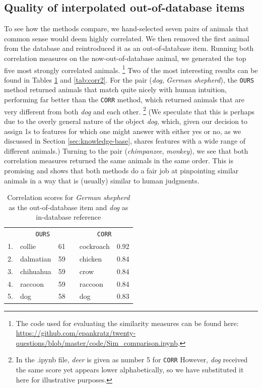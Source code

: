 \documentclass[11pt,a4paper]{article}
\begin{document}
{%
\subsection{Quality of interpolated out-of-database items}

To see how the methods compare, we hand-selected seven pairs of animals that common sense would deem highly correlated. We then removed the first animal from the database and reintroduced it as an out-of-database item. Running both correlation measures on the now-out-of-database animal, we generated the top five most strongly correlated animals.%
    \footnote{The code used for evaluating the similarity measures can be found here:  \url{https://github.com/epankratz/twenty-questions/blob/master/code/Sim_comparison.ipynb}.}
Two of the most interesting results can be found in Tables \ref{tab:corr1} and \ref{tab:corr2}.
For the pair (\textit{dog}, \textit{German shepherd}), the \texttt{OURS} method returned animals that match quite nicely with human intuition, performing far better than the \texttt{CORR} method, which returned animals that are very different from both \textit{dog} and each other.%
    \footnote{In the .ipynb file, \textit{deer} is given as number 5 for \texttt{CORR} However, \textit{dog} received the same score yet appears lower alphabetically, so we have substituted it here for illustrative purposes.}
(We speculate that this is perhaps due to the overly general nature of the object \textit{dog}, which, given our decision to assign 1s to features for which one might answer with either yes or no, as we discussed in Section \ref{sec:knowledge-base}, shares features with a wide range of different animals.) 
Turning to the pair (\textit{chimpanzee}, \textit{monkey}), we see that both correlation measures returned the same animals in the same order. 
This is promising and shows that both methods do a fair job at pinpointing similar animals in a way that is (usually) similar to human judgments.

\begin{table}[h]
    \centering
    \begin{tabular}{clcclc}
    \toprule
    & \multicolumn{2}{c}{\texttt{OURS}} && \multicolumn{2}{c}{\texttt{CORR}} \\
    \cmidrule{2-3} \cmidrule{5-6}
    1. & collie & 61 && cockroach & 0.92 \\
    2. & dalmatian & 59 && chicken & 0.84 \\
    3. & chihuahua & 59 && crow & 0.84 \\
    4. & raccoon & 59 && raccoon & 0.84 \\
    5. & dog & 58 && dog & 0.83 \\
    \bottomrule
    \end{tabular}
\caption{Correlation scores for \textit{German shepherd} as the out-of-database item and \textit{dog} as in-database reference}
\label{tab:corr1}
\end{table}

}
\end{document}
